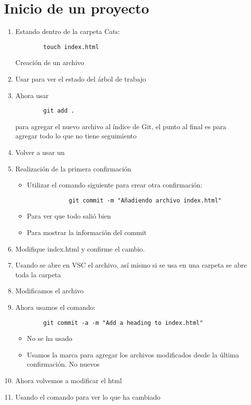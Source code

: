 \section{Inicio de un proyecto}

\begin{enumerate}
    \item Estando dentro de la carpeta Cats:
    \begin{verbatim}
        touch index.html
    \end{verbatim}
    Creación de un archivo
    \item Usar  para ver el estado del árbol de trabajo
    \item Ahora usar 
    \begin{verbatim}
        git add .
    \end{verbatim}
    para agregar el nuevo archivo al índice de Git, el punto al final es para agregar todo lo que no tiene seguimiento
    \item Volver a usar un 
    \item Realización de la primera confirmación
    \begin{itemize}
        \item Utilizar el comando siguiente para crear otra confirmación:
        \begin{verbatim}
            git commit -m "Añadiendo archivo index.html"
        \end{verbatim}
        \item {} Para ver que todo salió bien
        \item {} Para mostrar la información del commit
    \end{itemize}
    \item Modifique index.html y confirme el cambio.
    \item Usando  se abre en VSC el archivo, así mismo si se usa  en una carpeta se abre toda la carpeta
    \item Modificamos el archivo
    \item Ahora usamos el comando:
    \begin{verbatim}
        git commit -a -m "Add a heading to index.html"
    \end{verbatim}
    \begin{itemize}
        \item No se ha usado 
        \item Usamos la marca  para agregar los archivos modificados desde la última confirmación. No nuevos
    \end{itemize}
    \item Ahora volvemos a modificar el html
    \item Usando el comando  para ver lo que ha cambiado
\end{enumerate}